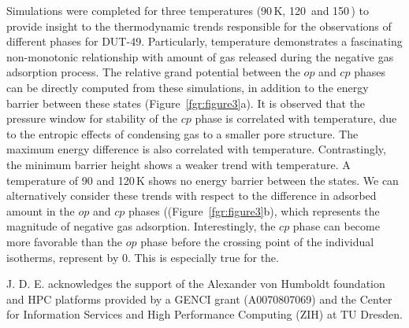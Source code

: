 \documentclass[journal=jacsat,manuscript=communication]{achemso}
\begin{document}

Simulations were completed for three temperatures (90$\,$K, 120$\,$ and 150$\,$) to provide insight to the thermodynamic trends responsible for the observations of different phases for DUT-49.
Particularly, temperature demonstrates a fascinating non-monotonic relationship with amount of gas released during the negative gas adsorption process.
The relative grand potential between the $op$ and $cp$ phases can be directly computed from these simulations, in addition to the energy barrier between these states (Figure~\ref{fgr:figure3}a). It is observed that the pressure window for stability of the $cp$ phase is correlated with temperature, due to the entropic effects of condensing gas to a smaller pore structure.
The maximum energy difference is also correlated with temperature.
Contrastingly, the minimum barrier height shows a weaker trend with temperature.
A temperature of 90 and 120$\,$K shows no energy barrier between the states.
We can alternatively consider these trends with respect to the difference in  adsorbed amount in the $op$ and $cp$ phases ((Figure~\ref{fgr:figure3}b), which represents the magnitude of negative gas adsorption. 
Interestingly, the $cp$ phase can become more favorable than the $op$ phase before the crossing point of the individual isotherms, represent by 0.
This is especially true for the.








\begin{acknowledgement}
  J. D. E. acknowledges the support of the Alexander von Humboldt foundation and HPC platforms provided by a GENCI grant (A0070807069) and the Center for Information Services and High Performance Computing (ZIH) at TU Dresden.
\end{acknowledgement}
\end{document}
